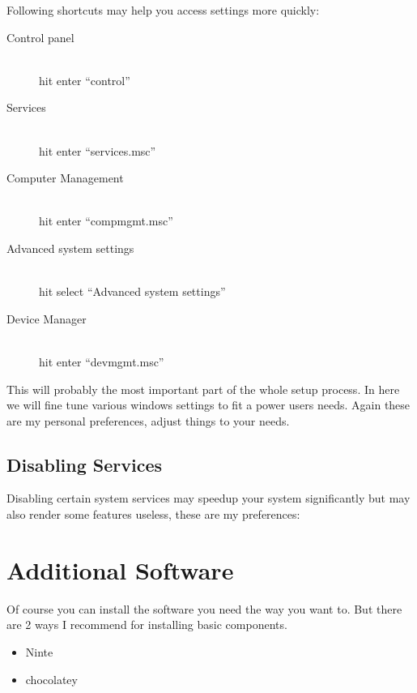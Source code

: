 \documentclass{itsarticle}
\begin{document}
Following shortcuts may help you access settings more quickly:

\begin{description}
    \item[Control panel] \hfill \\
        hit  enter ``control''

    \item[Services] \hfill \\
        hit  enter ``services.msc''

    \item[Computer Management] \hfill \\
        hit  enter ``compmgmt.msc''

    \item[Advanced system settings] \hfill \\
        hit  select ``Advanced system settings''

    \item[Device Manager] \hfill \\
        hit  enter ``devmgmt.msc''
\end{description}

This will probably the most important part of the whole setup process. In here
we will fine tune various windows settings to fit a power users needs. Again
these are my personal preferences, adjust things to your needs.

\subsection{Disabling Services}
\label{ssec:services}

Disabling certain system services may speedup your system significantly but may
also render some features useless, these are my preferences:


\section{Additional Software}
\label{sec:software}

Of course you can install the software you need the way you want to. But there
are 2 ways I recommend for installing basic components.

\begin{itemize}
    \item Ninte\footnotemark
    \item chocolatey\footnotemark
\end{itemize}
\end{document}
